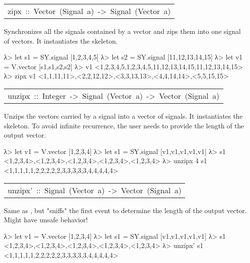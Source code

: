 \begin{haddockdesc}
\begin{interactive}
\end{interactive}\par
           

\item[\begin{tabular}{@{}l}
zipx\ ::\ Vector\ (Signal\ a)\ ->\ Signal\ (Vector\ a)
\end{tabular}]\haddockbegindoc
Synchronizes all the signals contained by a vector and zips them
 into one signal of vectors. It instantiates the
  skeleton.\par
\begin{interactive}
λ> let s1 = SY.signal [1,2,3,4,5]
λ> let s2 = SY.signal [11,12,13,14,15]
λ> let v1 = V.vector [s1,s1,s2,s2]
λ> v1
<{1,2,3,4,5},{1,2,3,4,5},{11,12,13,14,15},{11,12,13,14,15}>
λ> zipx v1
{<1,1,11,11>,<2,2,12,12>,<3,3,13,13>,<4,4,14,14>,<5,5,15,15>}

\end{interactive}\par
           

\item[\begin{tabular}{@{}l}
unzipx\ ::\ Integer\ ->\ Signal\ (Vector\ a)\ ->\ Vector\ (Signal\ a)
\end{tabular}]\haddockbegindoc
Unzips the vectors carried by a signal into a vector of
 signals. It instantiates the 
 skeleton. To avoid infinite recurrence, the user needs to provide
 the length of the output vector.\par
\begin{interactive}
λ> let v1 = V.vector [1,2,3,4]
λ> let s1 = SY.signal [v1,v1,v1,v1,v1]
λ> s1
{<1,2,3,4>,<1,2,3,4>,<1,2,3,4>,<1,2,3,4>,<1,2,3,4>}
λ> unzipx 4 s1
<{1,1,1,1,1},{2,2,2,2,2},{3,3,3,3,3},{4,4,4,4,4}>

\end{interactive}\par
           

\item[\begin{tabular}{@{}l}
unzipx'\ ::\ Signal\ (Vector\ a)\ ->\ Vector\ (Signal\ a)
\end{tabular}]\haddockbegindoc
Same as , but "sniffs" the first event to determine the length of the output vector. Might have unsafe behavior!\par
\begin{interactive}
λ> let v1 = V.vector [1,2,3,4]
λ> let s1 = SY.signal [v1,v1,v1,v1,v1]
λ> s1
{<1,2,3,4>,<1,2,3,4>,<1,2,3,4>,<1,2,3,4>,<1,2,3,4>}
λ> unzipx' s1
<{1,1,1,1,1},{2,2,2,2,2},{3,3,3,3,3},{4,4,4,4,4}>

\end{interactive}
\end{haddockdesc}